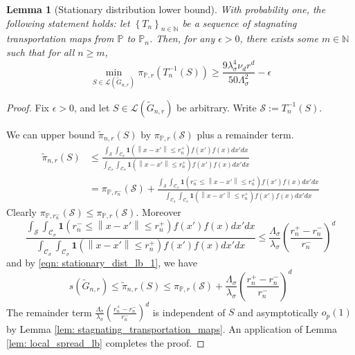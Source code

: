\documentclass{article}
\newcommand{\norm}[1]{\left\lVert#1\right\rVert}
\newcommand{\set}[1]{\left\{#1\right\}}
\newcommand{\seq}[1]{\set{#1}_{n \in \N}}
\newcommand{\Naturals}{\mathbb{N}}
\newcommand{\N}{\mathbb{N}}
\newcommand{\Cset}{\mathcal{C}}
\newcommand{\Sset}{\mathcal{S}}
\newcommand{\Csig}{\Cset_{\sigma}}
\newcommand{\Pbb}{\mathbb{P}}
\newcommand{\1}{\mathbf{1}}
\theoremstyle{alden}
\theoremstyle{aldenthm}
\newtheorem{lemma}{Lemma}
\theoremstyle{remark}
\begin{document}
\begin{lemma}[Stationary distribution lower bound]
	\label{lem: stationary_dist_lb}
	With probability one, the following statement holds: let $\seq{T_n}$ be a sequence of stagnating transportation maps from $\Pbb$ to $\Pbb_n$. Then, for any $\epsilon > 0$, there exists some $m \in \Naturals$ such that for all $n \geq m$,
	\begin{equation*}
	\min_{S \in \mathcal{L}(\widetilde{G}_{n,r})} \pi_{\Pbb,r}(T_n^{-1}(S)) \geq \frac{9\lambda_{\sigma}^4 \nu_d r^d}{50\Lambda_{\sigma}^2}  - \epsilon
	\end{equation*}
\end{lemma}
\begin{proof}
	Fix $\epsilon > 0$, and let $S \in \mathcal{L}(\widetilde{G}_{n,r})$ be arbitrary. Write $\Sset := T_n^{-1}(S)$. 
	
	We can upper bound $\widetilde{\pi}_{n,r}(S)$ by $\pi_{\Pbb,r}(\Sset)$ plus a remainder term.
	\begin{align}
	\widetilde{\pi}_{n,r}(S) & \leq \frac{\int_\Sset \int_{\Csig} \1(\norm{x - x'} \leq r_n^+) f(x') f(x) dx' dx}{\int_{\Csig} \int_{\Csig} \1(\norm{x - x'} \leq r_n^+) f(x') f(x) dx' dx} \nonumber \\
	& = \pi_{\Pbb,r_n^-}(\Sset) + \frac{\int_\Sset \int_{\Csig} \1(r_n^- \leq \norm{x - x'} \leq r_n^+) f(x') f(x) dx' dx}{\int_{\Csig} \int_{\Csig} \1(\norm{x- x'} \leq r_n^+) f(x') f(x) dx' dx} \label{eqn: stationary_dist_lb_1}
	\end{align}
	Clearly $\pi_{\Pbb,r_n^-}(\Sset) \leq \pi_{\Pbb,r}(\Sset)$. Moreover
	\begin{equation*}
	\frac{\int_\Sset \int_{\Csig} \1(r_n^- \leq \norm{x - x'} \leq r_n^+) f(x') f(x) dx' dx}{\int_{\Csig} \int_{\Csig} \1(\norm{x - x'} \leq r_n^+) f(x') f(x) dx' dx} \leq \frac{\Lambda_{\sigma}}{\lambda_{\sigma}} \left(\frac{r_n^+ - r_n^-}{r_n^-}\right)^d
	\end{equation*}
	and by \eqref{eqn: stationary_dist_lb_1}, we have
	\begin{equation*}
	s(\widetilde{G}_{n,r}) \leq \widetilde{\pi}_{n,r}(S) \leq \pi_{\Pbb,r}(\Sset) + \frac{\Lambda_{\sigma}}{\lambda_{\sigma}} \left(\frac{r_n^+ - r_n^-}{r_n^-}\right)^d
	\end{equation*}
	The remainder term $\frac{\Lambda_{\sigma}}{\lambda_{\sigma}} \left(\frac{r_n^+ - r_n^-}{r_n^-}\right)^d$ is independent of $S$ and asymptotically $o_p(1)$ by Lemma \ref{lem: stagnating_transportation_maps}.
	An application of Lemma \ref{lem: local_spread_lb} completes the proof.
\end{proof}
\end{document}

